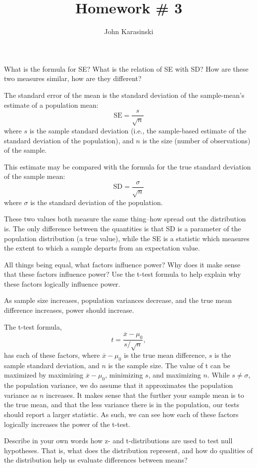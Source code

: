 \documentclass[onecolumn,10pt]{jhwhw}
\author{John Karasinski}
\title{Homework \# 3}
\begin{document}

\problem{}
What is the formula for SE? What is the relation of SE with SD?  How are these two measures similar, how are they different?

\solution
The standard error of the mean is the standard deviation of the sample-mean's estimate of a population mean:
$$\text{SE} = \frac{s}{\sqrt{n}}$$
where $s$ is the sample standard deviation (i.e., the sample-based estimate of the standard deviation of the population), and
$n$ is the size (number of observations) of the sample.

This estimate may be compared with the formula for the true standard deviation of the sample mean:
$$\text{SD} = \frac{\sigma}{\sqrt{n}}$$
where $\sigma$ is the standard deviation of the population.

These two values both measure the same thing--how spread out the distribution is. The only difference between the quantities is that SD is a parameter of the population distribution (a true value), while the SE is a statistic which measures the extent to which a sample departs from an expectation value.

\problem{}
All things being equal, what factors influence power? Why does it make sense that these factors influence power? Use the t-test formula to help explain why these factors logically influence power.

\solution
As sample size increases, population variances decrease, and the true mean difference increases, power should increase.

The t-test formula,
$$t = \frac{\overline{x} - \mu_0}{s/\sqrt{n}},$$
has each of these factors, where $\overline{x} - \mu_0$ is the true mean difference, $s$ is the sample standard deviation, and $n$ is the sample size. The value of t can be maximized by maximizing $\overline{x} - \mu_0$, minimizing $s$, and maximizing $n$. While $s \neq  \sigma$, the population variance, we do assume that it approximates the population variance as $n$ increases. It makes sense that the further your sample mean is to the true mean, and that the less variance there is in the population, our tests should report a larger statistic. As such, we can see how each of these factors logically increases the power of the t-test.

\problem{}
Describe in your own words how z- and t-distributions are used to test null hypotheses. That is, what does the distribution represent, and how do qualities of the distribution help us evaluate differences between means?
\end{document}
